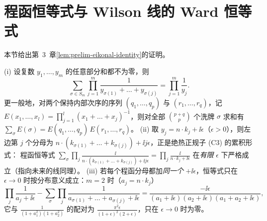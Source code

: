 \section{程函恒等式与 Wilson 线的 Ward 恒等式}\label{sec:appB-eikonal}

本节给出第~3~章\cref{lem:prelim-eikonal-identity}的证明。

\begin{lemma}\label{lem:appB-shuffle}
(i) 设复数 $y_1,\dots,y_m$ 的任意部分和都不为零，则
\begin{equation}\label{eq:appB-shuffle}
\sum_{\sigma\in S_m}\prod_{j=1}^m\frac{1}{y_{\sigma(1)}+\dots+y_{\sigma(j)}}=\prod_{j=1}^m\frac1{y_j}.
\end{equation}
更一般地，对两个保持内部次序的序列 $(q_1,\dots,q_p)$ 与 $(r_1,\dots,r_q)$，记 $E(x_1,\dots,x_l)=\prod_{j=1}^l(x_1+\dots+x_j)^{-1}$，则对全部 $\binom{p+q}{p}$ 个洗牌 $\sigma$ 求和有
$\sum_\sigma E(\sigma)=E(q_1,\dots,q_p)\,E(r_1,\dots,r_q)$。
(ii) 取 $y_j=n\cdot k_j+\ii\epsilon$（$\epsilon>0$），则左边第 $j$ 个分母为 $n\cdot(k_{\sigma(1)}+\dots+k_{\sigma(j)})+\ii j\epsilon$，正是绝热正规子 (C3) 的累积形式：
程函恒等式 $\sum_\sigma\prod_j\frac{\ii}{n\cdot(k_{\sigma(1)}+\dots+k_{\sigma(j)})+\ii j\epsilon}=\prod_j\frac{\ii}{n\cdot k_j+\ii\epsilon}$ 在\emph{有限} $\epsilon$ 下严格成立（指向未来的线同理）。
(iii) 若每个程函分母都加\emph{同一个} $+\ii\epsilon$，恒等式只在 $\epsilon\to0$ 时按分布意义成立：$m=2$ 时（$a_j=n\cdot k_j$）
\[
\prod_j\frac{1}{a_j+\ii\epsilon}-\sum_\sigma\prod_j\frac{1}{a_{\sigma(1)}+\dots+a_{\sigma(j)}+\ii\epsilon}=\frac{-\ii\epsilon}{(a_1+\ii\epsilon)(a_2+\ii\epsilon)(a_1+a_2+\ii\epsilon)},
\]
它与 $\frac1{(1+a_1^2)(1+a_2^2)}$ 的配对为 $\frac{\pi^2\epsilon}{(1+\epsilon)^2(2+\epsilon)}$，只在 $\epsilon\to0$ 时为零。
\end{lemma}

